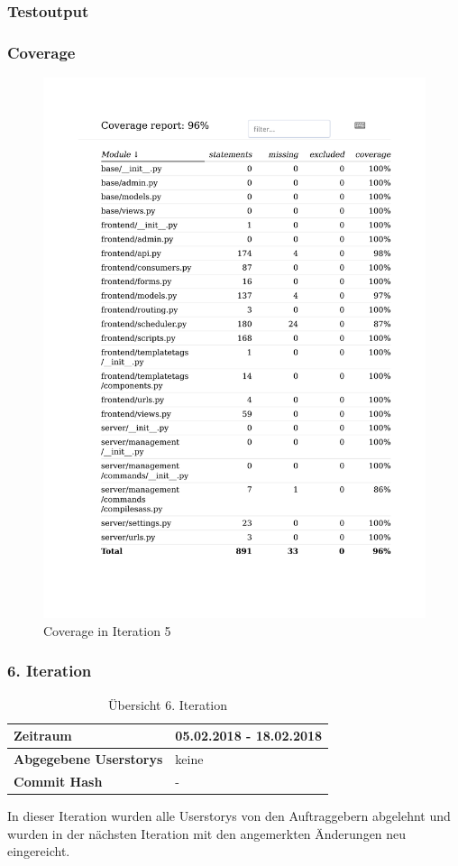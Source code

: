 \subsubsection{Testoutput }

\subsubsection{Coverage}
\begin{figure}[H]
	\centering
\includegraphics[width=.9\textwidth]{test_output/05_iteration_coverage.pdf}
	\caption{Coverage in Iteration 5}
\end{figure}

\subsubsection{6. Iteration}
\begin{table}[H]
\begin{center}
	\begin{tabular}{| l | l |}
		\hline
		\textbf{Zeitraum} &  05.02.2018 - 18.02.2018\\\hline
		\textbf{Abgegebene Userstorys} & keine\\\hline
		\textbf{Commit Hash} & - \\\hline
	\end{tabular}
	\caption{Übersicht 6. Iteration}
\end{center}
\end{table}
In dieser Iteration wurden alle Userstorys von den Auftraggebern abgelehnt und wurden in der nächsten Iteration mit
den angemerkten Änderungen neu eingereicht.

